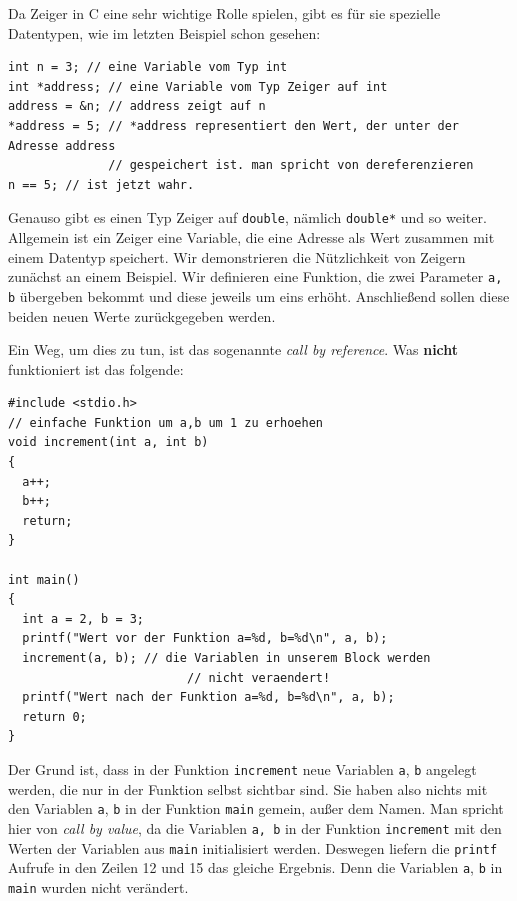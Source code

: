 Da Zeiger in C eine sehr wichtige Rolle spielen, gibt es für sie spezielle Datentypen, wie im letzten Beispiel schon gesehen:
\begin{lstlisting}
int n = 3; // eine Variable vom Typ int
int *address; // eine Variable vom Typ Zeiger auf int
address = &n; // address zeigt auf n
*address = 5; // *address representiert den Wert, der unter der Adresse address
              // gespeichert ist. man spricht von dereferenzieren
n == 5; // ist jetzt wahr.
\end{lstlisting}
Genauso gibt es einen Typ Zeiger auf \verb|double|, nämlich \verb|double*| und so weiter.
Allgemein ist ein Zeiger eine Variable, die eine Adresse als Wert zusammen mit einem Datentyp speichert.
Wir demonstrieren die Nützlichkeit von Zeigern zunächst an einem Beispiel.
Wir definieren eine Funktion, die zwei Parameter \verb|a, b| übergeben bekommt und diese jeweils um eins erhöht.
Anschließend sollen diese beiden neuen Werte zurückgegeben werden.

Ein Weg, um dies zu tun, ist das sogenannte \emph{call by reference}.
Was \textbf{nicht} funktioniert ist das folgende:
\begin{lstlisting}
#include <stdio.h>
// einfache Funktion um a,b um 1 zu erhoehen
void increment(int a, int b)
{
  a++;
  b++;
  return;
}

int main()
{
  int a = 2, b = 3;
  printf("Wert vor der Funktion a=%d, b=%d\n", a, b);
  increment(a, b); // die Variablen in unserem Block werden
                         // nicht veraendert!
  printf("Wert nach der Funktion a=%d, b=%d\n", a, b);
  return 0;
}
\end{lstlisting}
Der Grund ist, dass in der Funktion \verb|increment| neue Variablen \verb|a|, \verb|b| angelegt werden, die nur in der Funktion selbst sichtbar sind.
Sie haben also nichts mit den Variablen \verb|a|, \verb|b| in der Funktion \verb|main| gemein, außer dem Namen.
Man spricht hier von \emph{call by value}, da die Variablen \verb|a, b| in der Funktion \verb|increment| mit den Werten der Variablen aus \verb|main| initialisiert werden.
Deswegen liefern die \verb|printf| Aufrufe in den Zeilen 12 und 15 das gleiche Ergebnis.
Denn die Variablen \verb|a|, \verb|b| in \verb|main| wurden nicht verändert.

